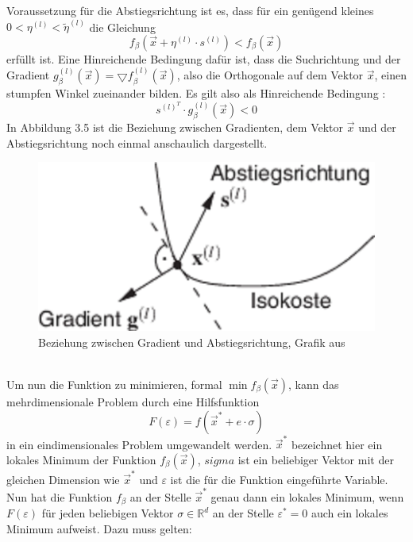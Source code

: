 Voraussetzung für die Abstiegsrichtung ist es, dass für ein genügend kleines $0 < \eta^{(l)} < \tilde{\eta}^{(l)}$ die Gleichung 
\begin{displaymath}
f_{\beta}(\vec x + \eta^{(l)} \cdot s^{(l)}) < f_{\beta}(\vec x)
\end{displaymath} erfüllt ist.
Eine Hinreichende Bedingung dafür ist, dass die Suchrichtung und der Gradient $g_\beta^{(l)}(\vec x) = \bigtriangledown f_\beta^{(l)}(\vec x)$, also die Orthogonale auf dem Vektor $\vec x$, einen stumpfen Winkel zueinander bilden. Es gilt also als Hinreichende Bedingung \cite{PAPA}:
\begin{displaymath}
s^{(l)^T} \cdot g_\beta^{(l)}(\vec x) < 0
\end{displaymath}
In Abbildung 3.5 ist die Beziehung zwischen Gradienten, dem Vektor $\vec x$ und der Abstiegsrichtung noch einmal anschaulich dargestellt.\\
\begin{figure}[ht]
\centering
\includegraphics[scale=1]{bilder/gradient}
\caption{Beziehung zwischen Gradient und Abstiegsrichtung, Grafik aus \cite{PAPA}}
\end{figure}\\
Um nun die Funktion zu minimieren, formal $\min f_\beta(\vec x)$, kann das mehrdimensionale Problem durch eine Hilfsfunktion 
\begin{displaymath}
F(\varepsilon) = f(\vec x^* +e \cdot \sigma)
\end{displaymath}
in ein eindimensionales Problem umgewandelt werden. $\vec x^*$ bezeichnet hier ein lokales Minimum der Funktion $f_\beta(\vec x)$, $sigma$ ist ein beliebiger Vektor mit der gleichen Dimension wie $\vec x^*$ und $\varepsilon$ ist die für die Funktion eingeführte Variable. Nun hat die Funktion $f_\beta$ an der Stelle $\vec x^*$ genau dann ein lokales Minimum, wenn $F(\varepsilon)$ für jeden beliebigen Vektor $\sigma \in \mathbb{R}^d$ an der Stelle $\varepsilon^*=0$ auch ein lokales Minimum aufweist. Dazu muss gelten:
